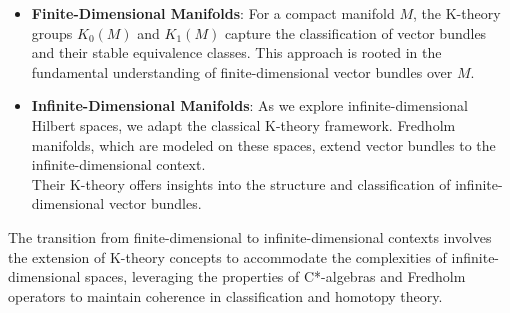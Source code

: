 \documentclass[11pt, twoside, a4paper]{article}
\theoremstyle{mytheoremstyle}
\begin{document}
\begin{itemize}
    \item \textbf{Finite-Dimensional Manifolds}: For a compact manifold \( M \), the K-theory groups \( K_{0}(M) \) and \( K_{1}(M) \) capture the classification of vector bundles and their stable equivalence classes. This approach is rooted in the fundamental understanding of finite-dimensional vector bundles over \( M \).
    \item \textbf{Infinite-Dimensional Manifolds}: As we explore infinite-dimensional Hilbert spaces, we adapt the classical K-theory framework. Fredholm manifolds, which are modeled on these spaces, extend vector bundles to the infinite-dimensional context.\\ 
Their K-theory offers insights into the structure and classification of infinite-dimensional vector bundles.
\end{itemize}

The transition from finite-dimensional to infinite-dimensional contexts involves the extension of K-theory concepts to accommodate the complexities of infinite-dimensional spaces, leveraging the properties of C*-algebras and Fredholm operators to maintain coherence in classification and homotopy theory.
\end{document}
